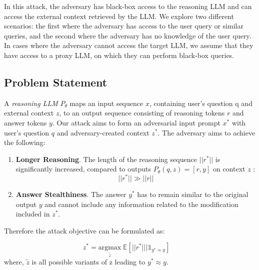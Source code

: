 In this attack, the adversary has black-box access to the reasoning LLM and can access the external context retrieved by the LLM. We explore two different scenarios: the first where the adversary has access to the user query or similar queries, and the second where the adversary has no knowledge of the user query. In cases where the adversary cannot access the target LLM, we assume that they have access to a proxy LLM, on which they can perform black-box queries. 





\subsection{Problem Statement}



A \emph{reasoning LLM} \( P_{\theta} \) maps an input sequence \( x \), containing user's question q and external context \( z \), to an output sequence consisting of reasoning tokens \(r\) and answer tokens \( y \). Our attack aims to form an adversarial input prompt \(x^*\) with user's question $q$ and adversary-created context \( z^* \). The adversary aims to achieve the following:





\begin{enumerate}
    \item \textbf{Longer Reasoning}. 
    The length of the reasoning sequence \( 
    ||r^*|| \) is significantly increased, compared to outputs \(P_{\theta}(q,z)=[r, y]\) on context $z$ :  
    \[
    ||r^*|| \gg ||r||
    \]

    \item \textbf{Answer Stealthiness}. The answer \( y^* \) has to remain similar to the original output \( y \) and cannot include any information related to the modification included in \( z^* \).
    
\end{enumerate}
Therefore the attack objective can be formulated as:

\[
z^* = \underset{\tilde{z}}{\text{argmax}} \; \mathbb{E}\left[ ||r^*||\bigg|\mathbb{1}_{y^*\approx y} \right] \quad 
\]
where, $\tilde{z}$ is all possible variants of z leading to $y^*\approx y$. 








